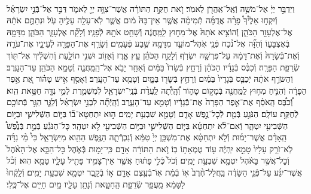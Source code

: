 \documentclass[twoside, openany, parskip=half, 11pt]{book}
\begin{document}
\begin{sometimes}
\begin{footnotesize}
\begin{multicols}{2}
\\
וַיְדַבֵּ֣ר יְיָ֔ אֶל־מֹשֶׁ֥ה וְֿאֶֽל־אַֽהֲרֹ֖ן לֵאמֹֽר׃ זֹ֚את חֻקַּ֣ת הַתּוֹרָ֔ה אֲשֶׁר־צִוָּ֥ה יְיָ֖ לֵאמֹ֑ר דַּבֵּ֣ר אֶל־בְּֿֿנֵ֣י יִשְׂרָאֵ֗ל וְֿיִקְח֣וּ אֵלֶ֩יךָ֩ פָרָ֨ה אֲדֻמָּ֜ה תְּֿמִימָ֗ה אֲשֶׁ֤ר אֵין־בָּהּ֙ מ֔וּם אֲשֶׁ֛ר לֹֽא־עָלָ֥ה עָלֶ֖יהָ עֹֽל׃ וּנְתַתֶּ֣ם אֹתָ֔הּ אֶל־אֶלְעָזָ֖ר הַכֹּהֵ֑ן וְֿהוֹצִ֤יא אֹתָהּ֙ אֶל־מִח֣וּץ לַֽמַּֽחֲנֶ֔ה וְֿשָׁחַ֥ט אֹתָ֖הּ לְֿפָנָֽיו׃ וְֿלָקַ֞ח אֶלְעָזָ֧ר הַכֹּהֵ֛ן מִדָּמָ֖הּ בְּֿאֶצְבָּע֑וֹ וְֿהִזָּ֞ה אֶל־נֹ֨כַח פְּֿנֵ֧י אֹֽהֶל־מוֹעֵ֛ד מִדָּמָ֖הּ שֶׁ֥בַע פְּֿעָמִֽים׃ וְֿשָׂרַ֥ף אֶת־הַפָּרָ֖ה לְֿעֵינָ֑יו אֶת־עֹרָ֤הּ וְֿאֶת־בְּֿֿשָׂרָהּ֙ וְֿאֶת־דָּמָ֔הּ עַל־פִּרְשָׁ֖הּ יִשְׂרֹֽף׃ וְֿלָקַ֣ח הַכֹּהֵ֗ן עֵ֥ץ אֶ֛רֶז וְֿאֵז֖וֹב וּשְׁנִ֣י תוֹלָ֑עַת וְֿהִשְׁלִ֕יךְ אֶל־תּ֖וֹךְ שְֿׂרֵפַ֥ת הַפָּרָֽה׃  וְֿכִבֶּ֨ס בְּֿגָדָ֜יו הַכֹּהֵ֗ן וְֿרָחַ֤ץ בְּֿשָׂרוֹ֙ בַּמַּ֔יִם וְֿאַחַ֖ר יָבֹ֣א אֶל־הַֽמַּֽחֲנֶ֑ה וְֿטָמֵ֥א הַכֹּהֵ֖ן עַד־הָעָֽרֶב׃ וְֿהַשֹּׂרֵ֣ף אֹתָ֔הּ יְֿכַבֵּ֤ס בְּֿגָדָיו֙ בַּמַּ֔יִם וְֿרָחַ֥ץ בְּֿשָׂר֖וֹ בַּמָּ֑יִם וְֿטָמֵ֖א עַד־הָעָֽרֶב׃ וְֿאָסַ֣ף אִ֣ישׁ טָה֗וֹר אֵ֚ת אֵ֣פֶר הַפָּרָ֔ה וְֿהִנִּ֛יחַ מִח֥וּץ לַֽמַּֽחֲנֶ֖ה בְּֿמָק֣וֹם טָה֑וֹר וְֽֿ֠הָֽיְֿתָ֠ה לַֽעֲדַ֨ת בְּֿנֵֽי־יִשְׂרָאֵ֧ל לְֿמִשְׁמֶ֛רֶת לְֿמֵ֥י נִדָּ֖ה חַטָּ֥את הִֽוא׃
וְֿ֠כִבֶּ֠ס הָֽאֹסֵ֨ף אֶת־אֵ֤פֶר הַפָּרָה֙ אֶת־בְּֿֿגָדָ֔יו וְֿטָמֵ֖א עַד־הָעָ֑רֶב וְֽֿהָֽיְֿתָ֞ה לִבְנֵ֣י יִשְׂרָאֵ֗ל וְֿלַגֵּ֛ר הַגָּ֥ר בְּֿתוֹכָ֖ם לְֿחֻקַּ֥ת עוֹלָֽם׃
הַנֹּגֵ֥עַ בְּֿמֵ֖ת לְֿכׇל־נֶ֣פֶשׁ אָדָ֑ם וְֿטָמֵ֖א שִׁבְעַ֥ת יָמִֽים׃ ה֣וּא יִתְחַטָּא־ב֞וֹ בַּיּ֧וֹם הַשְּֿׁלִישִׁ֛י וּבַיּ֥וֹם הַשְּֿׁבִיעִ֖י יִטְהָ֑ר וְֿאִם־לֹ֨א יִתְחַטָּ֜א בַּיּ֧וֹם הַשְּֿׁלִישִׁ֛י וּבַיּ֥וֹם הַשְּֿׁבִיעִ֖י לֹ֥א יִטְהָֽר׃ כׇּל־הַנֹּגֵ֡עַ בְּֿמֵ֣ת בְּֿנֶ֩פֶשׁ֩ הָֽאָדָ֨ם אֲשֶׁר־יָמ֜וּת וְֿלֹ֣א יִתְחַטָּ֗א אֶת־מִשְׁכַּ֤ן יְיָ֙ טִמֵּ֔א וְֿנִכְרְֿתָ֛ה הַנֶּ֥פֶשׁ הַהִ֖וא מִיִּשְׂרָאֵ֑ל כִּי֩ מֵ֨י נִדָּ֜ה לֹֽא־זֹרַ֤ק עָלָיו֙ טָמֵ֣א יִֽהְיֶ֔ה ע֖וֹד טֻמְאָת֥וֹ בֽוֹ׃ זֹ֚את הַתּוֹרָ֔ה אָדָ֖ם כִּֽי־יָמ֣וּת בְּֿאֹ֑הֶל כׇּל־הַבָּ֤א אֶל־הָאֹ֨הֶל֙ וְֿכׇל־אֲשֶׁ֣ר בָּאֹ֔הֶל יִטְמָ֖א שִׁבְעַ֥ת יָמִֽים׃ וְֿכֹל֙ כְּֿלִ֣י פָת֔וּחַ אֲשֶׁ֛ר אֵין־צָמִ֥יד פָּתִ֖יל עָלָ֑יו טָמֵ֖א הֽוּא׃ וְֿכֹ֨ל אֲשֶׁר־יִגַּ֜ע עַל־פְּֿֿנֵ֣י הַשָּׂדֶ֗ה בַּֽחֲלַל־חֶ֨רֶב֙ א֣וֹ בְֿמֵ֔ת אֽוֹ־בְֿֿעֶ֥צֶם אָדָ֖ם א֣וֹ בְֿקָ֑בֶר יִטְמָ֖א שִׁבְעַ֥ת יָמִֽים׃ וְֿלָֽקְֿחוּ֙ לַטָּמֵ֔א מֵֽעֲפַ֖ר שְֿׂרֵפַ֣ת הַֽחַטָּ֑את וְֿנָתַ֥ן עָלָ֛יו מַ֥יִם חַיִּ֖ים אֶל־כֶּֽלִי׃


\end{multicols}
\end{footnotesize}
\end{sometimes}
\end{document}
